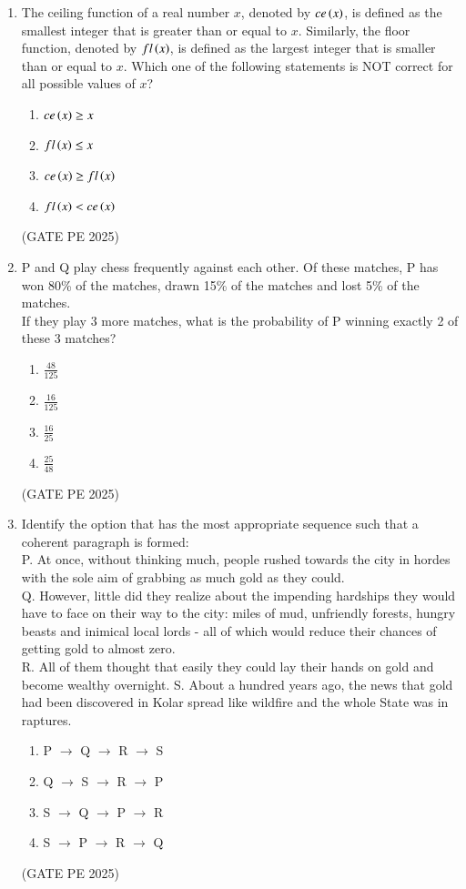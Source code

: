 \documentclass[journal,12pt,onecolumn]{IEEEtran}
\theoremstyle{remark}
\begin{document}
\begin{enumerate}
\item The ceiling function of a real number $x$, denoted by $ce\left(x\right)$, is defined as the smallest integer that is greater than or equal to $x$. Similarly, the floor function, denoted by $fl\left(x\right)$, is defined as the largest integer that is smaller than or equal to $x$. Which one of the following statements is NOT correct for all possible values of $x$?
\begin{enumerate}
    \item $ce\left(x\right)\geq x$
    \item $fl\left(x\right)\leq x$
    \item $ce\left(x\right)\geq fl\left(x\right)$
    \item $fl\left(x\right)< ce\left(x\right)$
\end{enumerate}
\hfill{(GATE PE 2025)}

\item P and Q play chess frequently against each other. Of these matches, P has won 80\% of the matches, drawn 15\% of the matches and lost 5\% of the matches.\\
If they play 3 more matches, what is the probability of P winning exactly 2 of these 3 matches?
\begin{enumerate}
    \item $\frac{48}{125}$
    \item $\frac{16}{125}$
    \item $\frac{16}{25}$
    \item $\frac{25}{48}$
\end{enumerate}
\hfill{(GATE PE 2025)}

\item Identify the option that has the most appropriate sequence such that a coherent paragraph is formed:\\
P. At once, without thinking much, people rushed towards the city in hordes with the sole aim of grabbing as much gold as they could.\\
Q. However, little did they realize about the impending hardships they would have to face on their way to the city: miles of mud, unfriendly forests, hungry beasts and inimical local lords - all of which would reduce their chances of getting gold to almost zero.\\
R. All of them thought that easily they could lay their hands on gold and become wealthy overnight.
S. About a hundred years ago, the news that gold had been discovered in Kolar spread like wildfire and the whole State was in raptures.
\begin{enumerate}
    \item P $\rightarrow$ Q $\rightarrow$ R $\rightarrow$ S
    \item Q $\rightarrow$ S $\rightarrow$ R $\rightarrow$ P
    \item S $\rightarrow$ Q $\rightarrow$ P $\rightarrow$ R
    \item S $\rightarrow$ P $\rightarrow$ R $\rightarrow$ Q
\end{enumerate}
\hfill{(GATE PE 2025)}


\end{enumerate}
\end{document}
